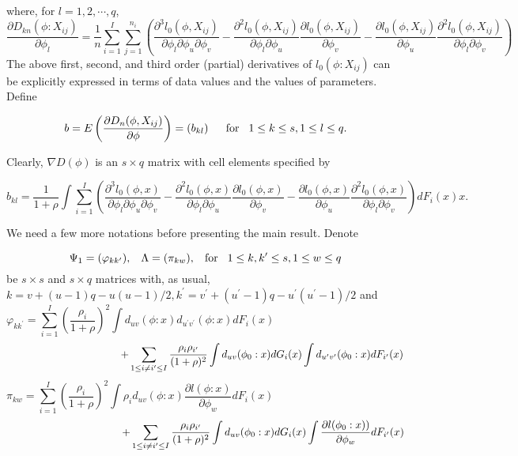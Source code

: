 \documentclass[12]{interact}
\theoremstyle{plain}%
\theoremstyle{definition}
\theoremstyle{remark}
\begin{document}
\noindent where, for $l=1, 2, \cdots, q$,
$$
\frac{\partial D_{kn}(\phi: X_{ij})}{\partial \phi_l}=\frac{1}{n}\sum_{i=1}^I\sum_{j=1}^{n_i}\left( \frac{\partial^3l_0(\phi, X_{ij})}{\partial \phi_l\partial \phi_u\partial \phi_v }-
\frac{\partial^2l_0(\phi, X_{ij})}{\partial \phi_l\partial \phi_u}\frac{\partial l_0(\phi, X_{ij})}{\partial \phi_v} - \frac{\partial l_0(\phi, X_{ij})}{\partial \phi_u}\frac{\partial^2l_0(\phi, X_{ij})}{\partial \phi_l\partial \phi_v}\right)
$$
The above first, second, and third order (partial) derivatives of $l_0(\phi: X_{ij})$ can be explicitly expressed in terms of data values and the values of parameters. Define

\begin{equation}
	b= E\left( \frac{\partial D_{n}(\phi,X_{ij})}{\partial \phi}\right)=\left( b_{kl} \right)\hspace{5mm}\mbox{for}\hspace{3mm} 1\le k \le s, 1 \le l \le q.
\end{equation}

\noindent Clearly, $\nabla D(\phi)$ is an $s\times q$ matrix with cell elements specified by

$$
b_{kl}=\frac{1}{1+\rho}\int\sum_{i=1}^I\left( \frac{\partial^3l_0(\phi, x)}{\partial \phi_l\partial \phi_u\partial \phi_v }-\frac{\partial^2l_0(\phi, x)}{\partial \phi_l\partial \phi_u}\frac{\partial l_0(\phi, x)}{\partial \phi_v} - \frac{\partial l_0(\phi, x)}{\partial \phi_u}\frac{\partial^2l_0(\phi, x)}{\partial \phi_l\partial \phi_v}\right)dF_i(x)x.
$$

We need a few more notations before presenting the main result. Denote

$$\Psi_1=(\varphi_{kk^\prime}), \hspace{3mm} \Lambda=(\pi_{kw}),\hspace{3mm}\mbox{for}\hspace{3mm} 1\le k, k^\prime \le s, 1 \le w \le q $$
\noindent be $s \times s$ and $s \times q$ matrices with, as usual, $k=v+(u-1)q-u(u-1)/2, k^\prime=v^\prime+(u^\prime-1)q-u^\prime(u^\prime-1)/2$ and
$$
\varphi_{kk^\prime}=\sum_{i=1}^I\left(\frac{\rho_i}{1+\rho}\right)^2\int d_{uv}(\phi:x)d_{u^\prime v^\prime}(\phi: x)dF_i(x)\hspace{2in}
$$
$$
\hspace{1.5in}+\sum_{1 \le i \ne i^\prime \le I}\frac{\rho_i\rho_{i^\prime}}{(1+\rho)^2}\int d_{uv}(\phi_0:x)dG_i(x)\int d_{u^\prime v^\prime}(\phi_0:x)dF_{i^\prime}(x)
$$
$$
\pi_{kw}=\sum_{i=1}^I\left(\frac{\rho_i}{1+\rho}\right)^2\int\rho_id_{uv}(\phi:x)\frac{\partial l(\phi:x)}{\partial \phi_w}dF_i(x)\hspace{2in}
$$
$$
\hspace{1.5in}+\sum_{1 \le i \ne i^\prime \le I}\frac{\rho_i\rho_{i^\prime}}{(1+\rho)^2}\int d_{uv}(\phi_0:x)dG_i(x)\int \frac{\partial l(\phi_0:x))}{\partial \phi_w}dF_{i^\prime}(x)
$$
\end{document}
